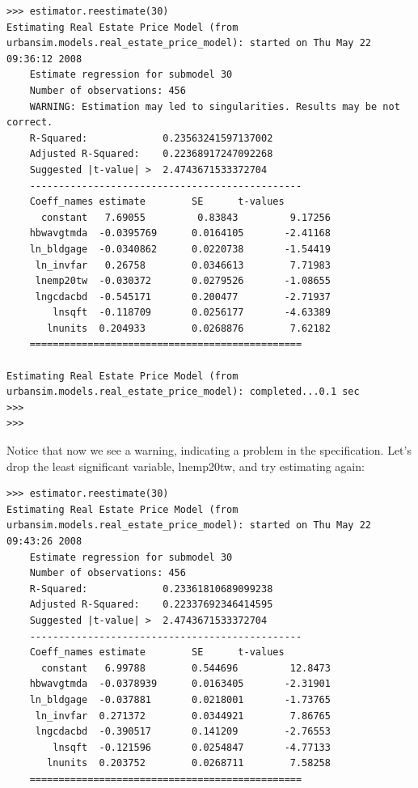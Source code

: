 \begin{lstlisting}
>>> estimator.reestimate(30)
Estimating Real Estate Price Model (from urbansim.models.real_estate_price_model): started on Thu May 22 09:36:12 2008
    Estimate regression for submodel 30
    Number of observations: 456
    WARNING: Estimation may led to singularities. Results may be not correct.
    R-Squared:             0.23563241597137002
    Adjusted R-Squared:    0.22368917247092268
    Suggested |t-value| >  2.4743671533372704
    -----------------------------------------------
    Coeff_names estimate        SE      t-values
      constant   7.69055         0.83843         9.17256
    hbwavgtmda  -0.0395769      0.0164105       -2.41168
    ln_bldgage  -0.0340862      0.0220738       -1.54419
     ln_invfar   0.26758        0.0346613        7.71983
     lnemp20tw  -0.030372       0.0279526       -1.08655
     lngcdacbd  -0.545171       0.200477        -2.71937
        lnsqft  -0.118709       0.0256177       -4.63389
       lnunits  0.204933        0.0268876        7.62182
    ===============================================

Estimating Real Estate Price Model (from urbansim.models.real_estate_price_model): completed...0.1 sec
>>> 
>>>
\end{lstlisting}

Notice that now we see a warning, indicating a problem in the specification.  Let's drop the least significant variable, lnemp20tw, and try estimating again:

\begin{lstlisting}
>>> estimator.reestimate(30)
Estimating Real Estate Price Model (from urbansim.models.real_estate_price_model): started on Thu May 22 09:43:26 2008
    Estimate regression for submodel 30
    Number of observations: 456
    R-Squared:             0.23361810689099238
    Adjusted R-Squared:    0.22337692346414595
    Suggested |t-value| >  2.4743671533372704
    -----------------------------------------------
    Coeff_names estimate        SE      t-values
      constant   6.99788        0.544696         12.8473
    hbwavgtmda  -0.0378939      0.0163405       -2.31901
    ln_bldgage  -0.037881       0.0218001       -1.73765
     ln_invfar  0.271372        0.0344921        7.86765
     lngcdacbd  -0.390517       0.141209        -2.76553
        lnsqft  -0.121596       0.0254847       -4.77133
       lnunits  0.203752        0.0268711        7.58258
    ===============================================
\end{lstlisting}

